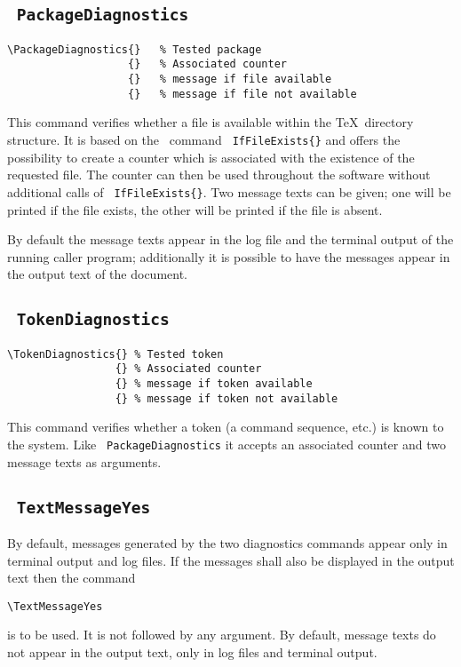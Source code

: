 \documentclass{ltxdoc}
\begin{document}
\subsection{\texttt{ PackageDiagnostics}}

\begin{verbatim}
\PackageDiagnostics{}	% Tested package
                   {}	% Associated counter
                   {}	% message if file available
                   {}	% message if file not available
\end{verbatim}

This command verifies whether a file is available within the \TeX\
directory structure. It is based on the \LaTeXe\ command
\texttt{ IfFileExists\{\}} and offers the possibility to
create a counter which is associated with the existence of the
requested file. The counter can then be used throughout the software
without additional calls of \texttt{\char92 IfFileExists\{\}}.
Two message texts can be given; one will be printed if the file
exists, the other will be printed if the file is absent.

By default the message texts appear in the log file and the terminal
output of the running caller program; additionally it is possible to
have the messages appear in the output text of the document.

\subsection{\texttt{ TokenDiagnostics}}

\begin{verbatim}
\TokenDiagnostics{}	% Tested token
                 {}	% Associated counter
                 {}	% message if token available
                 {}	% message if token not available
\end{verbatim}

This command verifies whether a token (a command sequence, etc.)
is known to the system. Like \texttt{\char92 PackageDiagnostics}
it accepts an associated counter and two message texts as arguments.

\subsection{\texttt{ TextMessageYes}}

By default, messages generated by the two diagnostics commands
appear only in terminal output and log files. If the messages shall
also be displayed in the output text then the command 
\begin{verbatim}
\TextMessageYes
\end{verbatim}
is to be used. It is not followed by any argument. By default,
message texts do not appear in the output text, only in log files
and terminal output.
\end{document}
